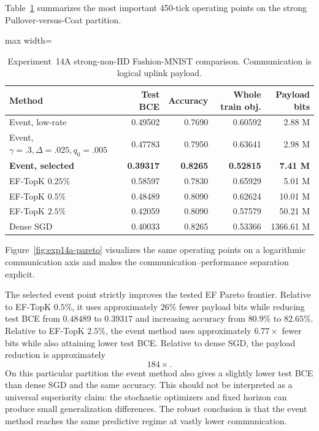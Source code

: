 Table~\ref{tab:exp14a-pareto} summarizes the most important 450-tick operating points on the strong Pullover-versus-Coat partition.

\begin{table}[t]
\centering
\caption{Experiment~14A strong-non-IID Fashion-MNIST comparison. Communication is logical uplink payload.}
\label{tab:exp14a-pareto}
\begin{adjustbox}{max width=\textwidth}
\begin{tabular}{lrrrr}
\toprule
Method & Test BCE & Accuracy & Whole train obj. & Payload bits\\
\midrule
Event, low-rate & 0.49502 & 0.7690 & 0.60592 & 2.88 M\\
Event, $\gamma=.3,\Delta=.025,q_0=.005$ & 0.47783 & 0.7950 & 0.63641 & 2.98 M\\
\textbf{Event, selected} & \textbf{0.39317} & \textbf{0.8265} & \textbf{0.52815} & \textbf{7.41 M}\\
EF-TopK $0.25\%$ & 0.58597 & 0.7830 & 0.65929 & 5.01 M\\
EF-TopK $0.5\%$ & 0.48489 & 0.8090 & 0.62624 & 10.01 M\\
EF-TopK $2.5\%$ & 0.42059 & 0.8090 & 0.57579 & 50.21 M\\
Dense SGD & 0.40033 & 0.8265 & 0.53366 & 1366.61 M\\
\bottomrule
\end{tabular}
\end{adjustbox}
\end{table}

Figure~\ref{fig:exp14a-pareto} visualizes the same operating points on a logarithmic communication axis and makes the communication--performance separation explicit.

\ExpFourteenAParetoFigure

The selected event point strictly improves the tested EF Pareto frontier. Relative to EF-TopK $0.5\%$, it uses approximately $26\%$ fewer payload bits while reducing test BCE from $0.48489$ to $0.39317$ and increasing accuracy from $80.9\%$ to $82.65\%$. Relative to EF-TopK $2.5\%$, the event method uses approximately $6.77\times$ fewer bits while also attaining lower test BCE. Relative to dense SGD, the payload reduction is approximately
\begin{equation}
\boxed{184\times}.
\end{equation}
On this particular partition the event method also gives a slightly lower test BCE than dense SGD and the same accuracy. This should not be interpreted as a universal superiority claim: the stochastic optimizers and fixed horizon can produce small generalization differences. The robust conclusion is that the event method reaches the same predictive regime at vastly lower communication.

